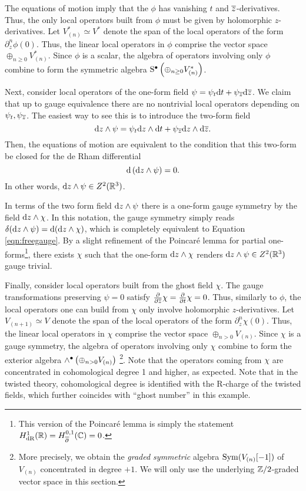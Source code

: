 \documentclass[11pt]{amsart}
\begin{document}
The equations of motion imply that the $\phi$ has vanishing $t$ and ${\overline{z}}$-derivatives. 
Thus, the only local operators built from $\phi$ must be given by holomorphic $z$-derivatives. 
Let $V^*_{(n)} \simeq V^*$ denote the span of the local operators of the form $\partial_z^n \phi(0)$.
Thus, the linear local operators in $\phi$ comprise the vector space $\oplus_{n \geq 0} V_{(n)}^*$.
Since $\phi$ is a scalar, the algebra of operators involving only $\phi$ combine to form the symmetric algebra ${\rm S}^\bullet \left(\oplus_{n \geq 0} V^*_{(n)}\right)$.

Next, consider local operators of the one-form field $\psi = \psi_t {\rm d} t + \psi_{\overline{z}} {\rm d} {\overline{z}}$. 
We claim that up to gauge equivalence there are no nontrivial local operators depending on $\psi_t, \psi_{\overline{z}}$.  
The easiest way to see this is to introduce the two-form field
\[
{\rm d} z \wedge \psi = \psi_t {\rm d} z \wedge {\rm d} t + \psi_{\overline{z}} {\rm d} z \wedge {\rm d} {\overline{z}} .
\]
Then, the equations of motion are equivalent to the condition that this two-form be closed for the de Rham differential
\[
{\rm d} \left({\rm d} z \wedge \psi\right) = 0 .
\]
In other words, ${\rm d} z \wedge \psi \in Z^2 (\mathbb R^3)$. 

In terms of the two form field ${\rm d} z \wedge \psi$ there is a one-form gauge symmetry by the field ${\rm d} z \wedge \chi$. 
In this notation, the gauge symmetry simply reads $\delta ({\rm d} z \wedge \psi) = {\rm d} ({\rm d} z \wedge \chi)$, which is completely equivalent to Equation \eqref{eqn:freegauge}.
By a slight refinement of the Poincar\'{e} lemma for partial one-forms\footnote{This version of the Poincar\'{e} lemma is simply the statement $H^1_{\rm dR} (\mathbb R) = H_{\overline{\partial}}^{0,1}(\mathbb C)= 0$.}, there exists $\chi$ such that the one-form ${\rm d} z \wedge \chi$ renders ${\rm d} z \wedge \psi \in Z^2(\mathbb R^3)$ gauge trivial. 


Finally, consider local operators built from the ghost field $\chi$. 
The gauge transformations preserving $\psi = 0$ satisfy $\frac{\partial}{\partial {\overline{z}}} \chi = \frac{\partial}{\partial t} \chi = 0$. 
Thus, similarly to $\phi$, the local operators one can build from $\chi$ only involve holomorphic $z$-derivatives. 
Let $V_{(n+1)} \simeq V$ denote the span of the local operators of the form $\partial_z^n \chi(0)$.
Thus, the linear local operators in $\chi$ comprise the vector space $\oplus_{n > 0} V_{(n)}$.
Since $\chi$ is a gauge symmetry, the algebra of operators involving only $\chi$ combine to form the exterior algebra $\wedge^\bullet \left(\oplus_{n > 0} V_{(n)}\right)$ \footnote{More precisely, we obtain the {\em graded symmetric} algebra $\operatorname{Sym}(V_{(n)}[-1])$ of $V_{(n)}$ concentrated in degree $+1$.
We will only use the underlying $\mathbb Z/2$-graded vector space in this section.}. Note that the operators coming from $\chi$ are concentrated in cohomological degree 1 and higher, as expected. Note that in the twisted theory, cohomological degree is identified with the R-charge of the twisted fields, which further coincides with ``ghost number'' in this example. 
\end{document}
